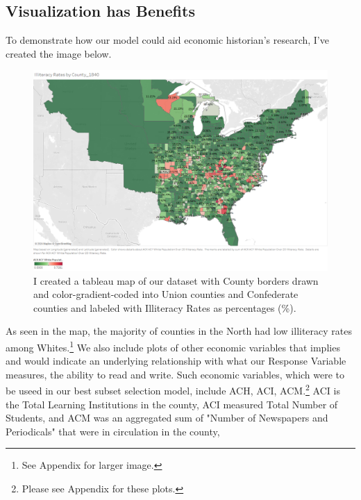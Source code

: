 \documentclass[a4paper,12pt]{article}
\begin{document}
\subsection{Visualization has Benefits}
To demonstrate how our model could aid economic historian's research, I've created the image below.
\begin{figure}[ht]
\centering
\includegraphics[scale=0.35]{IlliteracyRatesByCounty_1840.png}
\caption{I created a tableau map of our dataset with County borders drawn and color-gradient-coded into Union counties and Confederate counties and labeled with Illiteracy Rates as percentages (\%).}
\label{fig:IlliteracyRatesByCounty_1840}
\end{figure}
\newline
As seen in the map, the majority of counties in the North had low illiteracy rates among Whites.\footnote{See Appendix for larger image.}
We also include plots of other economic variables that implies and would indicate an underlying relationship with what our Response Variable measures, the ability to read and write. Such economic variables, which were to be useed in our best subset selection model, include ACH, ACI, ACM.\footnote{Please see Appendix for these plots.}
ACI is the Total Learning Institutions in the county, ACI measured Total Number of Students, and ACM was an aggregated sum of "Number of Newspapers and Periodicals" that were in circulation in the county,
\FloatBarrier %
\end{document}
